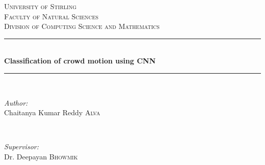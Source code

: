 %
%
%
	\begin{titlepage}
		
		\newcommand{\HRule}{\rule{\linewidth}{0.5mm}} %
		
		\center %
		
		
		\textsc{\LARGE University of Stirling}\\[1.5cm] %
		\textsc{\Large Faculty of Natural Sciences}\\[0.5cm] %
		\textsc{\large Division of Computing Science and Mathematics}\\[3.5cm] 
		\HRule \\[0.5cm]
		{ \huge \bfseries Classification of crowd motion using CNN}\\[1cm] %
		\HRule \\[1.2cm]
		
		
		\begin{minipage}{0.4\textwidth}
			\begin{flushleft} \large
				\emph{Author:}\\
				Chaitanya Kumar Reddy \textsc{Alva} %
			\end{flushleft}
		\end{minipage}
		~
		\begin{minipage}{0.4\textwidth}
			\begin{flushright} \large
				\emph{Supervisor:} \\
				Dr. Deepayan \textsc{Bhowmik} %
			\end{flushright}
		\end{minipage}\\[4cm]
		

\end{titlepage}
